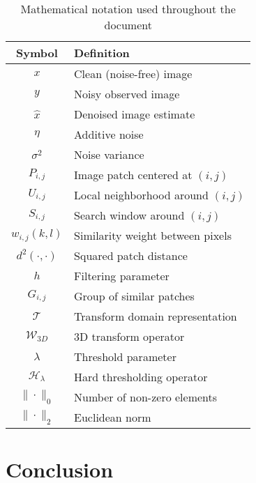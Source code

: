 \documentclass[12pt]{article}
\begin{document}
\begin{table}[htbp]
    \centering
    \begin{tabular}{cl}
        \toprule
        Symbol                  & Definition                        \\
        \midrule
        $x$                     & Clean (noise-free) image          \\
        $y$                     & Noisy observed image              \\
        $\hat{x}$               & Denoised image estimate           \\
        $\eta$                  & Additive noise                    \\
        $\sigma^2$              & Noise variance                    \\
        $P_{i,j}$               & Image patch centered at $(i,j)$   \\
        $U_{i,j}$               & Local neighborhood around $(i,j)$ \\
        $S_{i,j}$               & Search window around $(i,j)$      \\
        $w_{i,j}(k,l)$          & Similarity weight between pixels  \\
        $d^2(\cdot,\cdot)$      & Squared patch distance            \\
        $h$                     & Filtering parameter               \\
        $G_{i,j}$               & Group of similar patches          \\
        $\mathcal{T}$           & Transform domain representation   \\
        $\mathcal{W}_{3D}$      & 3D transform operator             \\
        $\lambda$               & Threshold parameter               \\
        $\mathcal{H}_{\lambda}$ & Hard thresholding operator        \\
        $\|\cdot\|_0$           & Number of non-zero elements       \\
        $\|\cdot\|_2$           & Euclidean norm                    \\
        \bottomrule
    \end{tabular}
    \caption{Mathematical notation used throughout the document}
    \label{tab:notation}
\end{table}

\section{Conclusion}
\label{sec:conclusion}
\end{document}
